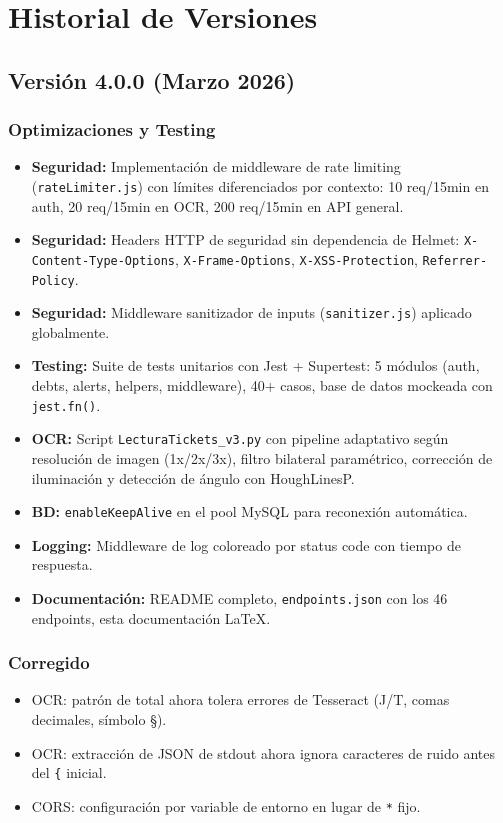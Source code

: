 \chapter{Historial de Versiones}

\section{Versión 4.0.0 (Marzo 2026)}

\subsection*{Optimizaciones y Testing}

\begin{itemize}[leftmargin=1.5cm]
  \item \textbf{Seguridad:} Implementación de middleware de rate limiting (\texttt{rateLimiter.js}) con límites diferenciados por contexto: 10 req/15min en auth, 20 req/15min en OCR, 200 req/15min en API general.
  \item \textbf{Seguridad:} Headers HTTP de seguridad sin dependencia de Helmet: \texttt{X-Content-Type-Options}, \texttt{X-Frame-Options}, \texttt{X-XSS-Protection}, \texttt{Referrer-Policy}.
  \item \textbf{Seguridad:} Middleware sanitizador de inputs (\texttt{sanitizer.js}) aplicado globalmente.
  \item \textbf{Testing:} Suite de tests unitarios con Jest + Supertest: 5 módulos (auth, debts, alerts, helpers, middleware), 40+ casos, base de datos mockeada con \texttt{jest.fn()}.
  \item \textbf{OCR:} Script \texttt{LecturaTickets\_v3.py} con pipeline adaptativo según resolución de imagen (1x/2x/3x), filtro bilateral paramétrico, corrección de iluminación y detección de ángulo con HoughLinesP.
  \item \textbf{BD:} \texttt{enableKeepAlive} en el pool MySQL para reconexión automática.
  \item \textbf{Logging:} Middleware de log coloreado por status code con tiempo de respuesta.
  \item \textbf{Documentación:} README completo, \texttt{endpoints.json} con los 46 endpoints, esta documentación LaTeX.
\end{itemize}

\subsection*{Corregido}
\begin{itemize}[leftmargin=1.5cm]
  \item OCR: patrón de total ahora tolera errores de Tesseract (J/T, comas decimales, símbolo §).
  \item OCR: extracción de JSON de stdout ahora ignora caracteres de ruido antes del \texttt{\{} inicial.
  \item CORS: configuración por variable de entorno en lugar de \texttt{*} fijo.
\end{itemize}

